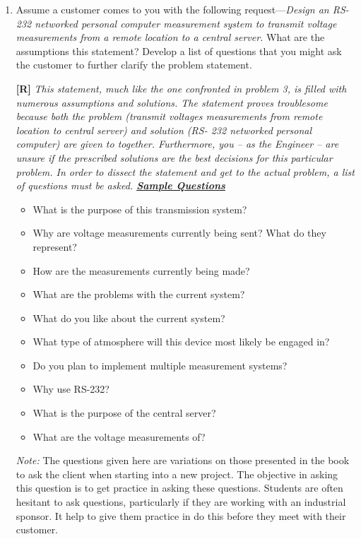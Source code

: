 \begin{enumerate}
\item
  Assume a customer comes to you with the following
  request---\emph{Design an RS-232 networked personal computer
  measurement system to transmit voltage measurements from a remote
  location to a central server.} What are the assumptions this
  statement? Develop a list of questions that you might ask the customer
  to further clarify the problem statement.

  \begin{onlysolution}
  \textbf{[R]}
  \itshape
  This statement, much like the one confronted in problem 3, is filled 
  with numerous assumptions and solutions. The statement proves troublesome 
  because both the problem (transmit voltages measurements from remote 
  location to central server) and solution (RS- 232 networked personal computer) 
  are given to together. Furthermore, you – as the Engineer – are unsure if 
  the prescribed solutions are the best decisions for this particular problem. 
  In order to dissect the statement and get to the actual problem, a list of 
  questions must be asked.
  \underline{\textit{\textbf{Sample Questions}}}
  \begin{itemize}
    \item What is the purpose of this transmission system?
    \item Why are voltage measurements currently being sent? What do they represent?
    \item How are the measurements currently being made?
    \item What are the problems with the current system?
    \item What do you like about the current system?
    \item What type of atmosphere will this device most likely be engaged in?
    \item Do you plan to implement multiple measurement systems?
    \item Why use RS-232?
    \item What is the purpose of the central server?
    \item What are the voltage measurements of?
  \end{itemize}
  \emph{Note:} The questions given here are variations on those presented in 
  the book to ask the client when starting into a new project. The objective 
  in asking this question is to get practice in asking these questions. Students 
  are often hesitant to ask questions, particularly if they are working with an 
  industrial sponsor. It help to give them practice in do this before they meet 
  with their customer.
  \end{onlysolution}


\end{enumerate}
